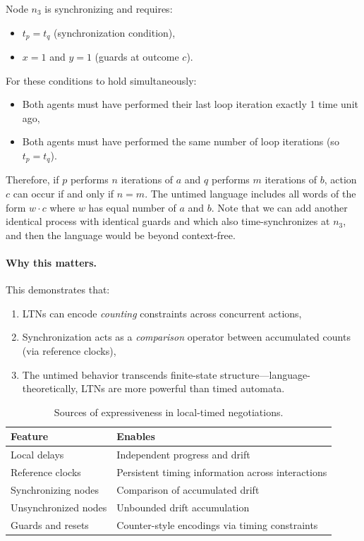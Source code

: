 \begin{example}
Node $n_3$ is synchronizing and requires:
\begin{itemize}
\item $t_p = t_q$ (synchronization condition),
\item $x = 1$ and $y = 1$ (guards at outcome $c$).
\end{itemize}

For these conditions to hold simultaneously:
\begin{itemize}
\item Both agents must have performed their last loop iteration exactly 1 time unit ago,
\item Both agents must have performed the same number of loop iterations (so $t_p = t_q$).
\end{itemize}

Therefore, if $p$ performs $n$ iterations of $a$ and $q$ performs $m$ iterations of $b$, action $c$ can occur if and only if $n = m$. The untimed language includes all words of the form $w \cdot c$ where $w$ has equal number of $a$ and $b$. Note that we can add another identical process with identical guards and which also time-synchronizes at $n_3$, and then the language would be beyond context-free.
\end{example}

\paragraph{Why this matters.} This demonstrates that:
\begin{enumerate}
\item LTNs can encode \emph{counting} constraints across concurrent actions,
\item Synchronization acts as a \emph{comparison} operator between accumulated counts (via reference clocks),
\item The untimed behavior transcends finite-state structure—language-theoretically, LTNs are more powerful than timed automata.
\end{enumerate}

\begin{table}[t]
\centering
\begin{tabular}{ll}
\hline
\textbf{Feature} & \textbf{Enables} \\
\hline
Local delays & Independent progress and drift \\
Reference clocks & Persistent timing information across interactions \\
Synchronizing nodes & Comparison of accumulated drift \\
Unsynchronized nodes & Unbounded drift accumulation \\
Guards and resets & Counter-style encodings via timing constraints \\
\hline
\end{tabular}
\caption{Sources of expressiveness in local-timed negotiations.}
\label{tab:ltn-expressiveness}
\end{table}

